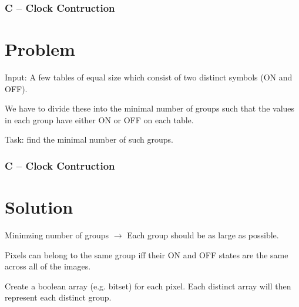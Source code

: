 \begin{frame}
  \frametitle{C -- Clock Contruction}
  \section*{Problem}
  Input: A few tables of equal size which consist of two distinct symbols (ON and OFF).

  We have to divide these into the minimal number of groups such that the values in each group have either ON or OFF on each table.

  Task: find the minimal number of such groups.
\end{frame}
\begin{frame}
  \frametitle{C -- Clock Contruction}
  \section*{Solution}

  Minimzing number of groups $\rightarrow$  Each group should be as large as possible.

  Pixels can belong to the same group iff their ON and OFF states are the same across all of the images.

  Create a boolean array (e.g. bitset) for each pixel. Each distinct array will then represent each distinct group.
\end{frame}

